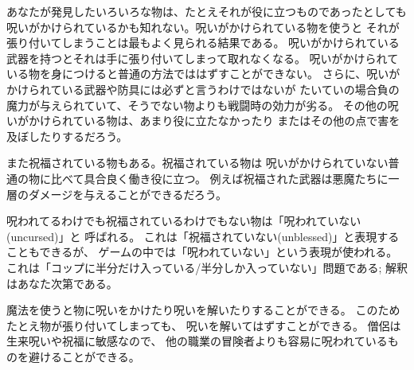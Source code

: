 あなたが発見したいろいろな物は、たとえそれが役に立つものであったとしても
呪いがかけられているかも知れない。呪いがかけられている物を使うと
それが張り付いてしまうことは最もよく見られる結果である。
呪いがかけられている武器を持つとそれは手に張り付いてしまって取れなくなる。
呪いがかけられている物を身につけると普通の方法でははずすことができない。
さらに、呪いがかけられている武器や防具には必ずと言うわけではないが
たいていの場合負の魔力が与えられていて、そうでない物よりも戦闘時の効力が劣る。
その他の呪いがかけられている物は、あまり役に立たなかったり
またはその他の点で害を及ぼしたりするだろう。

また祝福されている物もある。祝福されている物は
呪いがかけられていない普通の物に比べて具合良く働き役に立つ。
例えば祝福された武器は悪魔たちに一層のダメージを与えることができるだろう。

呪われてるわけでも祝福されているわけでもない物は「呪われていない(uncursed)」と
呼ばれる。
これは「祝福されていない(unblessed)」と表現することもできるが、
ゲームの中では「呪われていない」という表現が使われる。
これは「コップに半分だけ入っている/半分しか入っていない」問題である;
解釈はあなた次第である。

魔法を使うと物に呪いをかけたり呪いを解いたりすることができる。
このためたとえ物が張り付いてしまっても、
呪いを解いてはずすことができる。
僧侶は生来呪いや祝福に敏感なので、
他の職業の冒険者よりも容易に呪われているものを避けることができる。


